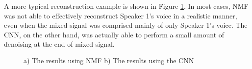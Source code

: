 \documentclass[12pt,chapterheads]{ucsd}
\begin{document}
A more typical reconstruction example is shown in Figure \ref{fig:diff_res}. In most cases, NMF was not able to effectively reconstruct Speaker 1's voice in a realistic manner, even when the mixed signal was comprised mainly of only Speaker 1's voice. The CNN, on the other hand, was actually able to perform a small amount of denoising at the end of mixed signal.

\begin{figure}[h]
    \begin{minipage}{.5\linewidth}
        \centering
    \end{minipage}%
    \begin{minipage}{.5\linewidth}
        \centering
    \end{minipage}
    \caption{ a) The results using NMF b) The results using the CNN}
    \label{fig:diff_res}
\end{figure}
\end{document}

